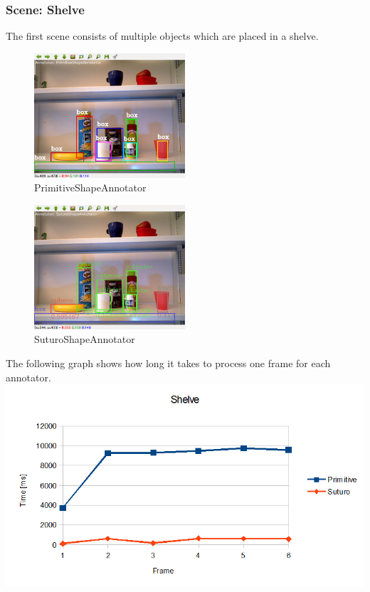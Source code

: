 \documentclass[main.tex]{subfiles}
\begin{document}
\subsubsection{Scene: Shelve}
The first scene consists of multiple objects which are placed in a shelve.
\begin{figure}
  \center
  \includegraphics[width=0.5\textwidth]{pictures/perception/shape_annotator/classification_test_shelve/primitive.png}
  \caption{PrimitiveShapeAnnotator}
  \label{fig:shapeAnnotatorShelvePrimitive}
\end{figure}
\begin{figure}
  \center
  \includegraphics[width=0.5\textwidth]{pictures/perception/shape_annotator/classification_test_shelve/suturo.png}
  \caption{SuturoShapeAnnotator}
  \label{fig:shapeAnnotatorShelveSuturo}
\end{figure}

The following graph shows how long it takes to process one frame for each annotator.
{\center
  \includegraphics[width=1.2\textwidth]{pictures/perception/shape_annotator/classification_test_shelve/chart.png}
}
\newpage
\end{document}
